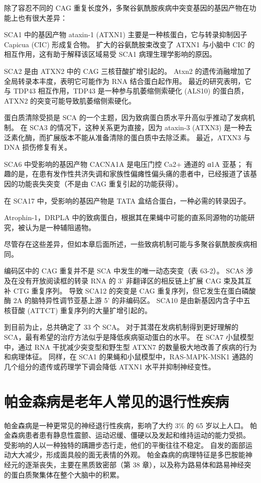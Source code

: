 除了容忍不同的 CAG 重复长度外，多聚谷氨酰胺疾病中突变基因的基因产物在功能上也有很大差异：

SCA1 中的基因产物 ataxin-1 (ATXN1) 主要是一种核蛋白，它与转录抑制因子 Capicua (CIC) 形成复合物。 扩大的谷氨酰胺束改变了 ATXN1 与小脑中 CIC 的相互作用，这有助于解释该区域易受 SCA1 病理生理学影响的原因。

SCA2 是由 ATXN2 中的 CAG 三核苷酸扩增引起的。 Atxn2 的遗传消融增加了全局转录本丰度，表明它可能作为 RNA 结合蛋白起作用。 最近的研究表明，它与 TDP43 相互作用，TDP43 是一种参与肌萎缩侧索硬化 (ALS10) 的蛋白质，ATXN2 的突变可能导致肌萎缩侧索硬化。

蛋白质清除受损是 SCA 的一个主题，因为致病蛋白质水平升高似乎推动了发病机制。 在 SCA3 的情况下，这种关系更为直接，因为 ataxin-3 (ATXN3) 是一种去泛素化酶，而扩展版本不能从准备清除的蛋白质中去除泛素。 最近，ATXN3 与 DNA 损伤修复有关。

SCA6 中受影响的基因产物 CACNA1A 是电压门控 Ca2+ 通道的 α1A 亚基； 有趣的是，在患有发作性共济失调和家族性偏瘫性偏头痛的患者中，已经报道了该基因的功能丧失突变（不是由 CAG 重复引起的功能获得）。

在 SCA17 中，受影响的基因产物是 TATA 盒结合蛋白，一种必需的转录因子。 

Atrophin-1，DRPLA 中的致病蛋白，根据其在果蝇中可能的直系同源物的功能研究，被认为是一种辅阻遏物。

尽管存在这些差异，但如本章后面所述，一些致病机制可能与多聚谷氨酰胺疾病相同。

编码区中的 CAG 重复并不是 SCA 中发生的唯一动态突变（表 63-2）。 SCA8 涉及在没有开放阅读框的转录 RNA 的 3' 非翻译区的相反链上扩展 CAG 束及其互补 CTG 重复序列。 导致 SCA12 的突变是 CAG 重复序列，但它发生在蛋白磷酸酶 2A 的脑特异性调节亚基上游 5' 的非编码区。 SCA10 是由新基因内含子中五核苷酸 (ATTCT) 重复序列的大量扩增引起的。

到目前为止，总共确定了 33 个 SCA。 对于其潜在发病机制得到更好理解的 SCA，最有希望的治疗方法似乎是降低疾病驱动蛋白的水平。 在 SCA7 小鼠模型中，通过 RNA 干扰减少突变型和野生型 ATXN7 的数量极大地改善了疾病的行为和病理体征。 同样，在 SCA1 的果蝇和小鼠模型中，RAS-MAPK-MSK1 通路的几个组分的遗传或药理学下调会降低 ATXN1 水平并抑制神经变性。

\section{帕金森病是老年人常见的退行性疾病}

帕金森病是一种更常见的神经退行性疾病，影响了大约 3\% 的 65 岁以上人口。 帕金森病患者患有静息性震颤、运动迟缓、僵硬以及发起和维持运动的能力受损。 受影响的人以一种独特的蹒跚步态行走，他们的平衡往往不稳定。 自发的面部运动大大减少，形成面具般的面无表情的外观。 帕金森病的病理特征是多巴胺能神经元的逐渐丧失，主要在黑质致密部（第 38 章），以及称为路易体和路易神经突的蛋白质聚集体在整个大脑中的积累。

